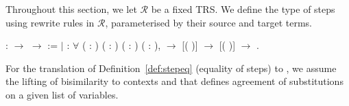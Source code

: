 Throughout this section, we let $\mathcal{R}$ be a fixed TRS. We
define the type of steps using rewrite rules in $\mathcal{R}$,
parameterised by their source and target terms.
\begin{singlespace}
\begin{coqdoccode}
\coqdocnoindent
{}  :
 \ensuremath{\rightarrow}
 \ensuremath{\rightarrow}
 :=\coqdoceol
\coqdocindent{1.00em}
\ensuremath{|}  :
\ensuremath{\forall} (  :
) (\coqdocvar{$\rho$} :
) ( :
) (\coqdocvar{$\sigma$} :
),\coqdoceol
\coqdocindent{6.50em} \coqdocvariable{$\rho$}
 \ensuremath{\rightarrow}\coqdoceol
\coqdocindent{6.50em}
[(
\coqdocvariable{$\rho$})\coqdocvariable{$^\sigma$}]  
\ensuremath{\rightarrow}\coqdoceol
\coqdocindent{6.50em}
[(
\coqdocvariable{$\rho$})\coqdocvariable{$^\sigma$}]  
\ensuremath{\rightarrow}\coqdoceol
\coqdocindent{6.50em}
 
.\coqdoceol
\end{coqdoccode}
\end{singlespace}
For the translation of Definition~\ref{def:stepeq} (equality of steps)
to \Coq, we assume the lifting of bisimilarity to contexts and that
defines agreement of substitutions on a given list of variables.
